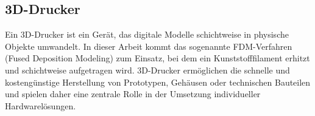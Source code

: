 \begin{inhalt}
\subsection{3D-Drucker}

Ein 3D-Drucker \cite{3DDruckerWiki} ist ein Gerät, das digitale Modelle schichtweise in physische Objekte umwandelt. In dieser Arbeit kommt das sogenannte FDM-Verfahren (Fused Deposition Modeling) zum Einsatz, bei dem ein Kunststofffilament erhitzt und schichtweise aufgetragen wird. 3D-Drucker ermöglichen die schnelle und kostengünstige Herstellung von Prototypen, Gehäusen oder technischen Bauteilen und spielen daher eine zentrale Rolle in der Umsetzung individueller Hardwarelösungen.


\end{inhalt}